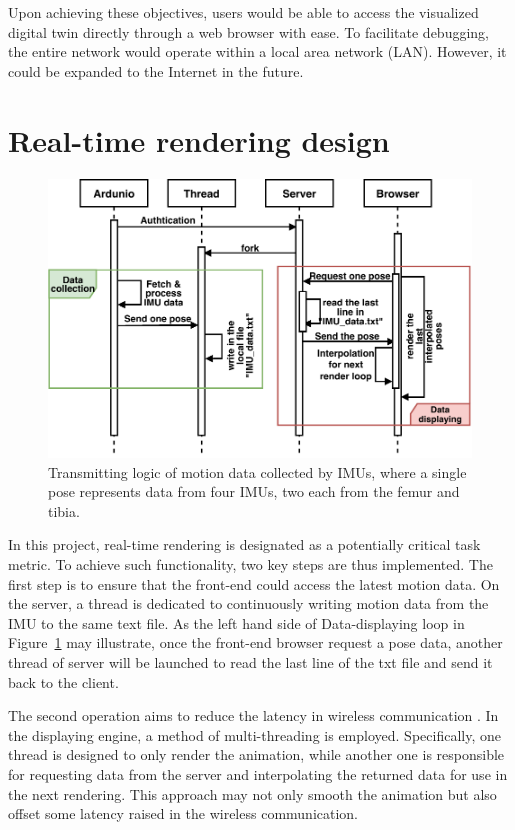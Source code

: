 Upon achieving these objectives, users would be able to access the visualized digital twin directly through a web browser with ease.
To facilitate debugging, the entire network would operate within a local area network (LAN). However, it could be expanded to the Internet in the future.

\section{Real-time rendering design}
\begin{figure}[htbp]
	\centering
	\includegraphics[clip, trim=0cm 0cm 0cm 0cm, width=\textwidth]{
		fileForWriting/sequence}
	\caption[Transmitting logic of motion data]{Transmitting logic of motion data collected by IMUs, where a single pose represents data from four IMUs, two each from the femur and tibia.}
	\label{fig:sequence}
\end{figure}
In this project, real-time rendering is designated as a potentially critical task metric.
To achieve such functionality, two key steps are thus implemented.
The first step is to ensure that the front-end could access the latest motion data.
On the server, a thread is dedicated to continuously writing motion data from the IMU to the same text file.
As the left hand side of Data-displaying loop in Figure~\ref{fig:sequence} may illustrate, once the front-end browser request a pose data, another thread of server will be launched to read the last line of the txt file and send it back to the client.

The second operation aims to reduce the latency in wireless communication .
In the displaying engine, a method of multi-threading is employed.
Specifically, one thread is designed to only render the animation, while another one is responsible for requesting data from the server and interpolating the returned data for use in the next rendering.
This approach may not only smooth the animation but also offset some latency raised in the wireless communication.

